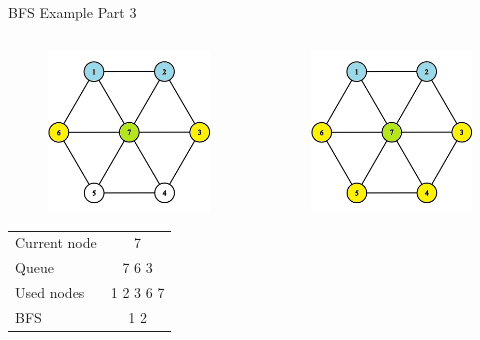 \documentclass[aspectratio=169]{beamer}%
\begin{document}
\begin{frame}{BFS Example Part 3}
\begin{columns}
\begin{column}{0.32\textwidth}
\begin{figure}[!ht]
                \includegraphics[width=0.9\linewidth]{bfs 8.png}
            \end{figure}
            \begin{table}[ht]
                \centering
                \begin{tabular}{l c}
                    Current node & 7\\
                    Queue & 7 6 3 \\ 
                    Used nodes & 1 2 3 6 7\\
                    BFS & 1 2
                \end{tabular}
            \end{table}
        \end{column}
        \hfill
        \begin{column}{0.32\textwidth}
            \begin{figure}[!ht]
                \centering
                \includegraphics[width=0.9\linewidth]{bfs 9.png}

\end{figure}
\end{column}
\end{columns}
\end{frame}
\end{document}
